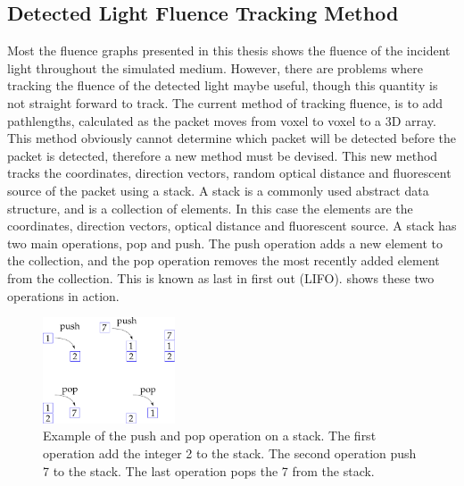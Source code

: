 \begin{appendices}


\chapter{Detected Light Fluence Tracking Method}
\label{app:lightdect}

Most the fluence graphs presented in this thesis shows the fluence of the incident light throughout the simulated medium.
However, there are problems where tracking the fluence of the detected light maybe useful, though this quantity is not straight forward to track.
The current method of tracking fluence, is to add pathlengths, calculated as the packet moves from voxel to voxel to a 3D array. 
This method obviously cannot determine which packet will be detected before the packet is detected, therefore a new method must be devised.
This new method tracks the coordinates, direction vectors, random optical distance and fluorescent source of the packet using a stack.
A stack is a commonly used abstract data structure, and is a collection of elements.
In this case the elements are the coordinates, direction vectors, optical distance and fluorescent source.
A stack has two main operations, pop and push.
The push operation adds a new element to the collection, and the pop operation removes the most recently added element from the collection.
This is known as last in first out (LIFO).
 shows these two operations in action.

\begin{figure}[!htpb]
	\centering
	\includegraphics[width=0.35\textwidth]{stack.pdf}
	\caption{Example of the push and pop operation on a stack. The first operation add the integer 2 to the stack. The second operation push 7 to the stack. The last operation pops the 7 from the stack.}
	\label{fig:stack}
\end{figure}


\end{appendices}
